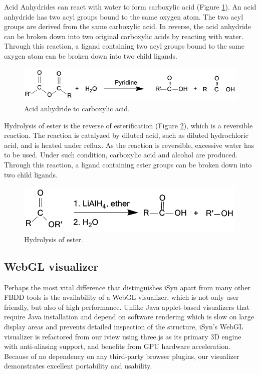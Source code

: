 Acid Anhydrides can react with water to form carboxylic acid (Figure \ref{isyn:AcidAnhydride}). An acid anhydride has two acyl groups bound to the same oxygen atom. The two acyl groups are derived from the same carboxylic acid. In reverse, the acid anhydride can be broken down into two original carboxylic acids by reacting with water. Through this reaction, a ligand containing two acyl groups bound to the same oxygen atom can be broken down into two child ligands.
 
\begin{figure}
\begin{center}
\includegraphics[width=\linewidth]{../isyn/AcidAnhydride.png}
\end{center}
\caption{Acid anhydride to carboxylic acid.}
\label{isyn:AcidAnhydride}
\end{figure}

Hydrolysis of ester is the reverse of esterification (Figure \ref{isyn:EsterHydrolysis}), which is a reversible reaction. The reaction is catalyzed by diluted acid, such as diluted hydrochloric acid, and is heated under reflux. As the reaction is reversible, excessive water has to be used. Under such condition, carboxylic acid and alcohol are produced. Through this reaction, a ligand containing ester groups can be broken down into two child ligands.

\begin{figure}
\begin{center}
\includegraphics[width=\linewidth]{../isyn/EsterHydrolysis.png}
\end{center}
\caption{Hydrolysis of ester.}
\label{isyn:EsterHydrolysis}
\end{figure}

\subsection{WebGL visualizer}

Perhaps the most vital difference that distinguishes iSyn apart from many other FBDD tools is the availability of a WebGL visualizer, which is not only user friendly, but also of high performance. Unlike Java applet-based visualizers that require Java installation and depend on software rendering which is slow on large display areas and prevents detailed inspection of the structure, iSyn’s WebGL visualizer is refactored from our iview \citep{1366} using three.js as its primary 3D engine with anti-aliasing support, and benefits from GPU hardware acceleration. Because of no dependency on any third-party browser plugins, our visualizer demonstrates excellent portability and usability.

